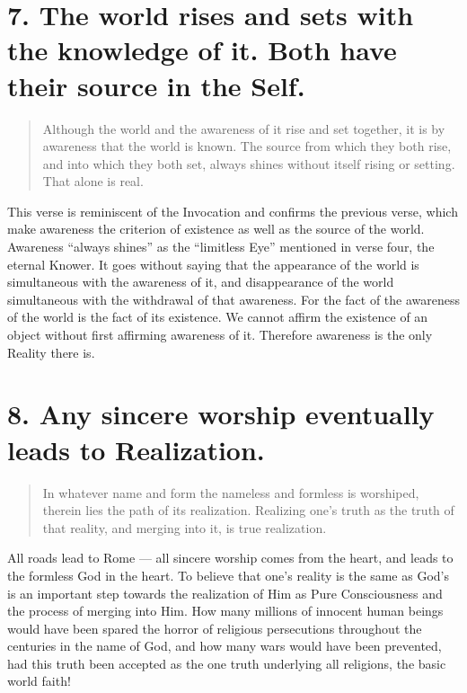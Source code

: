 \documentclass[12pt]{report}
\begin{document}
\section{7. The world rises and sets with the knowledge of it. Both
  have their source in the Self.}

\begin{quote}
  Although the world and the awareness of it rise and set together, it
  is by awareness that the world is known. The source from which they
  both rise, and into which they both set, always shines without itself
  rising or setting. That alone is real.
\end{quote}


This verse is reminiscent of the Invocation and confirms the previous
verse, which make awareness the criterion of existence as well as the
source of the world. Awareness ``always shines'' as the ``limitless
Eye'' mentioned in verse four, the eternal Knower. It goes without
saying that the appearance of the world is simultaneous with the
awareness of it, and disappearance of the world simultaneous with the
withdrawal of that awareness. For the fact of the awareness of the
world is the fact of its existence. We cannot affirm the existence of
an object without first affirming awareness of it. Therefore awareness
is the only Reality there is.

\section{8. Any sincere worship eventually leads to Realization.}

\begin{quote}
  In whatever name and form the nameless and formless is worshiped,
  therein lies the path of its realization. Realizing one's truth as the
  truth of that reality, and merging into it, is true realization.
\end{quote}


All roads lead to Rome --- all sincere worship comes from the heart,
and leads to the formless God in the heart. To believe that one's
reality is the same as God's is an important step towards the
realization of Him as Pure Consciousness and the process of merging
into Him. How many millions of innocent human beings would have been
spared the horror of religious persecutions throughout the centuries
in the name of God, and how many wars would have been prevented, had
this truth been accepted as the one truth underlying all religions,
the basic world faith!
\end{document}
